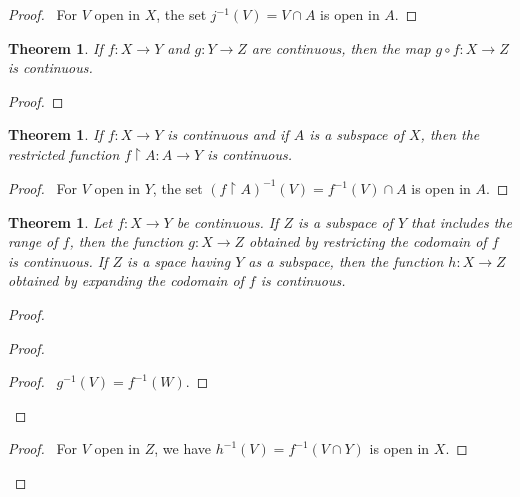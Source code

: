 \documentclass{report}
\let\qed\relax
\newtheorem{thm}[lm]{Theorem}
\theoremstyle{definition}
\begin{document}
  \begin{proof}
    \pf\ For $V$ open in $X$, the set $j^{-1}(V) = V \cap A$ is open in $A$.
  \end{proof}

  \begin{thm}
    If $f : X \rightarrow Y$ and $g : Y \rightarrow Z$ are continuous,
    then
    the map
    $g \circ f : X \rightarrow Z$ is continuous.
  \end{thm}

  \begin{proof}
    \pf
    \qed
  \end{proof}

  \begin{thm}
    If $f : X \rightarrow Y$ is continuous and if $A$ is a subspace of
    $X$,
    then
    the restricted function $f \restriction A : A \rightarrow Y$ is
    continuous.
  \end{thm}

  \begin{proof}
    \pf\ For $V$ open in $Y$, the set $(f \restriction A)^{-1}(V) = f^{-1}(V)
    \cap A$ is open in $A$. \qed
  \end{proof}

  \begin{thm}
    Let $f : X \rightarrow Y$ be continuous. If $Z$ is a subspace of $Y$
    that
    includes the range of $f$, then the function $g : X \rightarrow Z$
    obtained by
    restricting the codomain of $f$ is continuous. If $Z$ is a space having
    $Y$ as
    a subspace, then the function $h : X \rightarrow Z$ obtained by expanding
    the
    codomain of $f$ is continuous.
  \end{thm}

  \begin{proof}
    \pf
    \begin{proof}
      \begin{proof}
        \pf\ $g^{-1}(V) = f^{-1}(W)$.
      \end{proof}
    \end{proof}
    \begin{proof}
      \pf\ For $V$ open in $Z$, we have $h^{-1}(V) = f^{-1}(V \cap Y)$ is
      open
      in
      $X$.
    \end{proof}
    \qed
  \end{proof}
\end{document}
